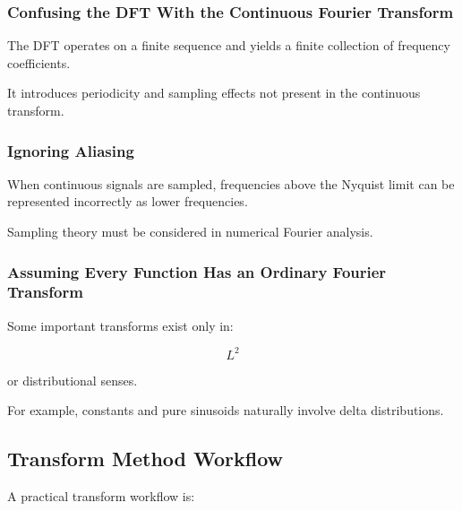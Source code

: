 \subsubsection{Confusing the DFT With the Continuous Fourier Transform}

The DFT operates on a finite sequence and yields a finite collection of
frequency coefficients.

It introduces periodicity and sampling effects not present in the continuous
transform.

\subsubsection{Ignoring Aliasing}

When continuous signals are sampled, frequencies above the Nyquist limit can
be represented incorrectly as lower frequencies.

Sampling theory must be considered in numerical Fourier analysis.

\subsubsection{Assuming Every Function Has an Ordinary Fourier Transform}

Some important transforms exist only in:

\[
\boxed{
L^2
}
\]

or distributional senses.

For example, constants and pure sinusoids naturally involve delta
distributions.

\subsection{Transform Method Workflow}
\label{subsec:transform-method-workflow}

A practical transform workflow is:

